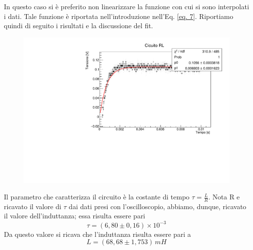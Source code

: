In questo caso si è preferito non linearizzare la funzione con cui si sono interpolati i dati. Tale funzione è riportata nell'introduzione nell'Eq. \ref{eq. 7}. Riportiamo quindi di seguito i risultati e la discussione del fit.

\begin{figure}[H]
    \centering
    \includegraphics[scale=.4]{Immagini/CircuitoRL.pdf}
    \caption{}
    \label{fig:my_label}
\end{figure}

Il parametro che caratterizza il circuito è la costante di tempo $\tau=\frac{L}{R}$. Nota R e ricavato il valore di $\tau$ dai dati presi con l'oscilloscopio, abbiamo, dunque, ricavato il valore dell'induttanza; essa risulta essere pari
$$
\tau = (6,80\pm 0,16)\times 10^{-3}
$$
Da questo valore si ricava che l'induttanza risulta essere pari a 
$$
L= (68,68 \pm 1,753)\,mH
$$
